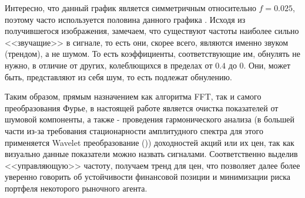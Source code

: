 Интересно, что данный график является симметричным относительно $f = 0.025$, поэтому часто используется половина данного графика \cite{brunton2022data}. Исходя из получившегося изображения, замечаем, что существуют частоты наиболее сильно <<звучащие>> в сигнале, то есть они, скорее всего, являются именно звуком (трендом), а не шумом. То есть коэффициенты, соответствующие им, обнулять не нужно, в отличие от других, колеблющихся в пределах от $0.4$ до 0. Они, может быть, представляют из себя шум, то есть подлежат обнулению.

Таким образом, прямым назначением как алгоритма FFT, так и самого преобразования Фурье, в настоящей работе является очистка показателей от шумовой компоненты, а также - проведения гармонического анализа  (в большей части из-за требования стационарности амплитудного спектра для этого применяется Wavelet преобразование ()) доходностей акций или их цен, так как визуально данные показатели можно назвать сигналами. Соответственно выделив <<управляющую>> частоту, получаем тренд для цен, что позволяет далее более уверенно говорить об устойчивости финансовой позиции и минимизации риска портфеля некоторого рыночного агента.

